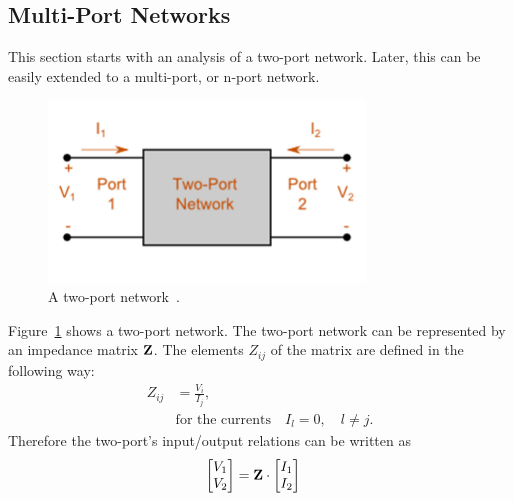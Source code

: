 \subsection{Multi-Port Networks}
\label{sec:multiport_networks}

This section starts with an analysis of a two-port network.
Later, this can be easily extended to a multi-port, or n-port network.
\begin{figure}[h]
\begin{center}
\includegraphics[width=0.75\textwidth]{images/twoport.png}
\caption{A two-port network~\cite{magnus:twoport}.}
\label{fig:twoport}
\end{center}
\end{figure}

Figure~\ref{fig:twoport} shows a two-port network.
The two-port network can be represented by an impedance matrix $\mathbf{Z}$.
The elements $Z_{ij}$ of the matrix are defined in the following way:
\begin{align}
\label{eq:multiport_impedance}
Z_{ij} &= \frac{V_i}{I_j},\\\nonumber
&\text{for the currents}\quad I_l = 0,\quad l\neq j.
\end{align}
Therefore the two-port's input/output relations can be written as
\begin{align}
\label{eq:twoport_io}
\begin{bmatrix}
V_1\\V_2
\end{bmatrix} &= \mathbf{Z} \cdot
\begin{bmatrix}
I_1\\I_2
\end{bmatrix}
\end{align}

